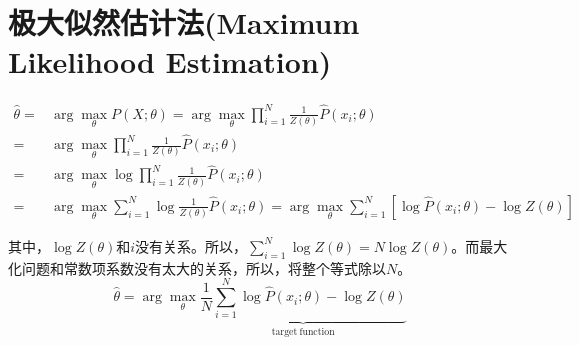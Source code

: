 \documentclass[a4paper]{article}
\begin{document}
\section{极大似然估计法(Maximum Likelihood Estimation)}
\begin{equation}
    \begin{split}
        \hat{\theta} = & \arg\max_{\theta} P(X;\theta) = \arg\max_{\theta} \prod_{i=1}^N \frac{1}{Z(\theta)}\hat{P}(x_i;\theta) \\
        = & \arg\max_{\theta} \prod_{i=1}^N \frac{1}{Z(\theta)}\hat{P}(x_i;\theta) \\
        = & \arg\max_{\theta} \log \prod_{i=1}^N \frac{1}{Z(\theta)}\hat{P}(x_i;\theta) \\
        = & \arg\max_{\theta} \sum_{i=1}^N \log  \frac{1}{Z(\theta)}\hat{P}(x_i;\theta) = \arg\max_{\theta} \sum_{i=1}^N \left[\log \hat{P}(x_i;\theta) - \log Z(\theta) \right]
    \end{split}
\end{equation}

其中，$\log Z(\theta)$和$i$没有关系。所以，$\sum_{i=1}^N \log Z(\theta) = N \log Z(\theta)$。而最大化问题和常数项系数没有太大的关系，所以，将整个等式除以$N$。
\begin{equation}
    \hat{\theta} = \arg\max_{\theta}\underbrace{\frac{1}{N} \sum_{i=1}^N \log \hat{P}(x_i;\theta) - \log Z(\theta)}_{\mathrm{target\ function}}
\end{equation}
\end{document}
